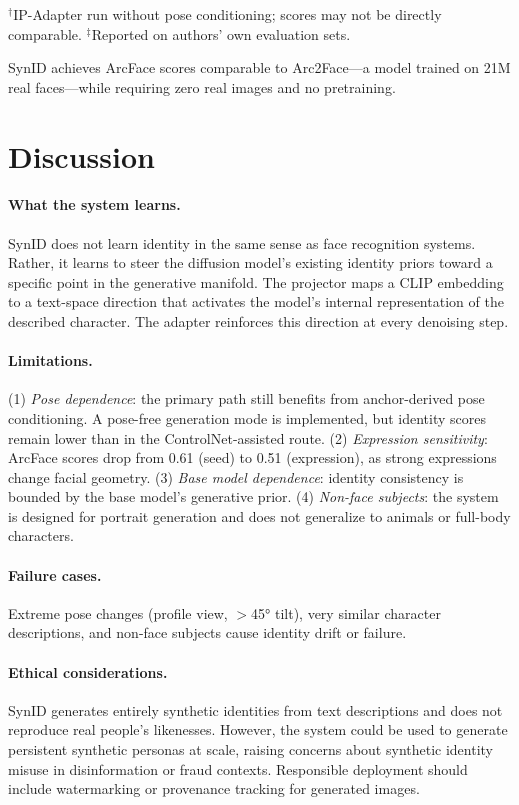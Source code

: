 \documentclass[10pt,twocolumn]{article}
\begin{document}
$^\dagger$IP-Adapter run without pose conditioning; scores may not be directly comparable. $^\ddagger$Reported on authors' own evaluation sets.

SynID achieves ArcFace scores comparable to Arc2Face---a model trained on 21M real faces---while requiring zero real images and no pretraining.

\section{Discussion}

\paragraph{What the system learns.}
SynID does not learn identity in the same sense as face recognition systems. Rather, it learns to steer the diffusion model's existing identity priors toward a specific point in the generative manifold. The projector maps a CLIP embedding to a text-space direction that activates the model's internal representation of the described character. The adapter reinforces this direction at every denoising step.

\paragraph{Limitations.}
(1) \textit{Pose dependence}: the primary path still benefits from anchor-derived pose conditioning. A pose-free generation mode is implemented, but identity scores remain lower than in the ControlNet-assisted route. (2) \textit{Expression sensitivity}: ArcFace scores drop from 0.61 (seed) to 0.51 (expression), as strong expressions change facial geometry. (3) \textit{Base model dependence}: identity consistency is bounded by the base model's generative prior. (4) \textit{Non-face subjects}: the system is designed for portrait generation and does not generalize to animals or full-body characters.

\paragraph{Failure cases.}
Extreme pose changes (profile view, $>$45° tilt), very similar character descriptions, and non-face subjects cause identity drift or failure.

\paragraph{Ethical considerations.}
SynID generates entirely synthetic identities from text descriptions and does not reproduce real people's likenesses. However, the system could be used to generate persistent synthetic personas at scale, raising concerns about synthetic identity misuse in disinformation or fraud contexts. Responsible deployment should include watermarking or provenance tracking for generated images.
\end{document}
